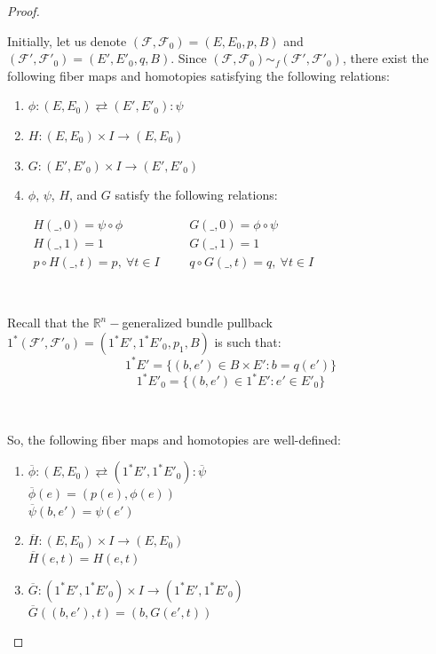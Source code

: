 \documentclass[12pt,oneside]{book}
\newcommand{\R}{\mathbb{R}}
\begin{document}
    \begin{proof}

        \

        Initially, let us denote $(\mathcal{F},\mathcal{F}_{0})=(E,E_{0},p,B)$ and $(\mathcal{F'},\mathcal{F'}_{0})=(E',E'_{0},q,B)$. Since 
        $(\mathcal{F},\mathcal{F}_{0})\sim_{f} (\mathcal{F'},\mathcal{F'}_{0})$, there exist the following fiber maps and homotopies 
        satisfying the following relations:
        
        \begin{enumerate}
            \item $\phi:(E,E_{0}) \rightleftarrows (E',E'_{0}):\psi$
            \item $H:(E,E_{0}) \times I \to (E,E_{0})$
            \item $G:(E',E'_{0}) \times I \to (E',E'_{0})$
            \item $\phi$, $\psi$, $H$, and $G$ satisfy the following relations:
            
                $\begin{array}{lccl}
                    H(\_, 0) = \psi \circ \phi & & & G(\_, 0) = \phi \circ \psi \\
                    H(\_, 1) = 1 & & & G(\_, 1) = 1 \\
                    p \circ H(\_, t) = p, \ \forall t \in I & & & q \circ G(\_, t) = q, \ \forall t \in I
                \end{array}$
        \end{enumerate}
        
        \
        
        Recall that the $\R^{n}-$generalized bundle pullback 
        $1^{*}(\mathcal{F'},\mathcal{F'}_{0})=(1^{*}E',1^{*}E'_{0},p_{1},B)$ is such that:
        $$1^{*}E'=\{ (b,e')\in B\times E' : b=q(e') \}$$
        $$1^{*}E'_{0}=\{ (b,e')\in 1^{*}E' : e'\in E'_{0} \}$$
        
        \

        So, the following fiber maps and homotopies are 
        well-defined:
        
        \begin{enumerate}
            \item $\overline{\phi}:(E,E_{0})\rightleftarrows (1^{*}E',1^{*}E'_{0}):\overline{\psi}$ \\
            $\overline{\phi}(e)=(p(e),\phi(e))$ \\
            $\overline{\psi}(b,e')=\psi(e')$
            \item $\overline{H}:(E,E_{0})\times I\to (E,E_{0})$ \\
            $\overline{H}(e,t)=H(e,t)$
            \item $\overline{G}:(1^{*}E',1^{*}E'_{0})\times I\to (1^{*}E',1^{*}E'_{0})$ \\
            $\overline{G}((b,e'),t)=(b,G(e',t))$
        \end{enumerate}


\end{proof}
\end{document}
